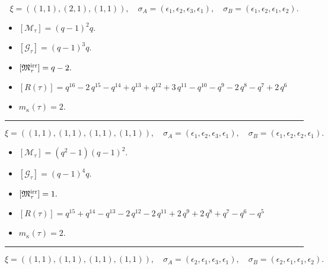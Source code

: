\documentclass[10pt,a4paper]{amsart}
\begin{document}
$$\xi = ({(1, 1)}, {(2, 1)}, {(1, 1)}),\quad \sigma_A = ({{\epsilon_1}}, {{\epsilon_2, \epsilon_3}}, {{\epsilon_1}}),\quad \sigma_B = ({{\epsilon_1}}, {{\epsilon_2, \epsilon_1}}, {{\epsilon_2}}).$$

\begin{itemize}
 \item $[\mathcal{M}_{\tau}] = {\left(q - 1\right)}^{2} q .$

 \item $[\mathcal{G}_{\tau}] = {\left(q - 1\right)}^{3} q .$

 \item $[{\frak M}_{\tau}^{\textrm{irr}}] = q - 2 .$

 \item $[R(\tau)] = q^{16} - 2 \, q^{15} - q^{14} + q^{13} + q^{12} + 3 \, q^{11} - q^{10} - q^{9} - 2 \, q^{8} - q^{7} + 2 \, q^{6} $

 \item $m_{\kappa}(\tau) = 2 .$

 \end{itemize}
\noindent\rule{8cm}{0.4pt}

$$\xi = ({(1, 1)}, {(1, 1), (1, 1)}, {(1, 1)}),\quad \sigma_A = ({{\epsilon_1}}, {{\epsilon_2}, {\epsilon_3}}, {{\epsilon_1}}),\quad \sigma_B = ({{\epsilon_1}}, {{\epsilon_2}, {\epsilon_2}}, {{\epsilon_1}}).$$

\begin{itemize}
 \item $[\mathcal{M}_{\tau}] = {\left(q^{2} - 1\right)} {\left(q - 1\right)}^{2} .$

 \item $[\mathcal{G}_{\tau}] = {\left(q - 1\right)}^{4} q .$

 \item $[{\frak M}_{\tau}^{\textrm{irr}}] = 1 .$

 \item $[R(\tau)] = q^{15} + q^{14} - q^{13} - 2 \, q^{12} - 2 \, q^{11} + 2 \, q^{9} + 2 \, q^{8} + q^{7} - q^{6} - q^{5} $

 \item $m_{\kappa}(\tau) = 2 .$

 \end{itemize}
\noindent\rule{8cm}{0.4pt}

$$\xi = ({(1, 1)}, {(1, 1), (1, 1)}, {(1, 1)}),\quad \sigma_A = ({{\epsilon_2}}, {{\epsilon_1}, {\epsilon_3}}, {{\epsilon_1}}),\quad \sigma_B = ({{\epsilon_2}}, {{\epsilon_1}, {\epsilon_1}}, {{\epsilon_2}}).$$
\end{document}
